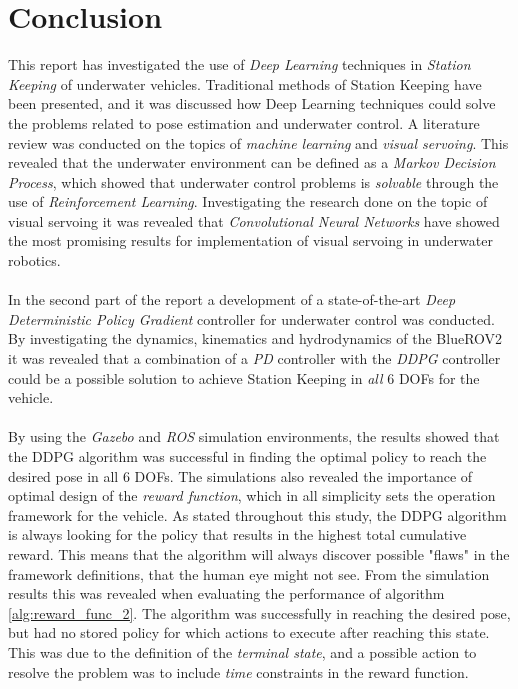 \chapter{Conclusion}
This report has investigated the use of \textit{Deep Learning} techniques in \textit{Station Keeping} of underwater vehicles. Traditional methods of Station Keeping have been presented, and it was discussed how Deep Learning techniques could solve the problems related to pose estimation and underwater control. A literature review was conducted on the topics of \textit{machine learning} and \textit{visual servoing}. This revealed that the underwater environment can be defined as a \textit{Markov Decision Process}, which showed that underwater control problems is \textit{solvable} through the use of \textit{Reinforcement Learning}. Investigating the research done on the topic of visual servoing it was revealed that \textit{Convolutional Neural Networks} have showed the most promising results for implementation of visual servoing in underwater robotics.\\\\
In the second part of the report a development of a state-of-the-art \textit{Deep Deterministic Policy Gradient} controller for underwater control was conducted. By investigating the dynamics, kinematics and hydrodynamics of the BlueROV2 it was revealed that a combination of a \textit{PD} controller with the \textit{DDPG} controller could be a possible solution to achieve Station Keeping in \textit{all} 6 DOFs for the vehicle.\\\\
By using the \textit{Gazebo} and \textit{ROS} simulation environments, the results showed that the DDPG algorithm was successful in finding the optimal policy to reach the desired pose in all 6 DOFs. The simulations also revealed the importance of optimal design of the \textit{reward function}, which in all simplicity sets the operation framework for the vehicle. As stated throughout this study, the DDPG algorithm is always looking for the policy that results in the highest total cumulative reward. This means that the algorithm will always discover possible "flaws" in the framework definitions, that the human eye might not see. From the simulation results this was revealed when evaluating the performance of algorithm \ref{alg:reward_func_2}. The algorithm was successfully in reaching the desired pose, but had no stored policy for which actions to execute after reaching this state. This was due to the definition of the \textit{terminal state}, and a possible action to resolve the problem was to include \textit{time} constraints in the reward function. 
